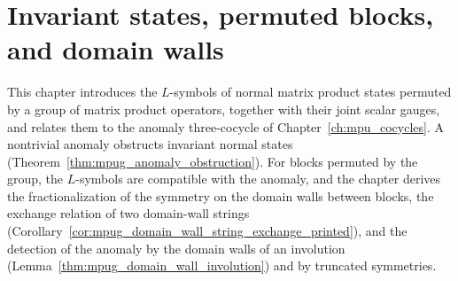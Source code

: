 \chapter{Invariant states, permuted blocks, and domain walls}
\label{ch:mpu_cocycles_permuted_blocks}

This chapter introduces the $L$-symbols of normal matrix product states
permuted by a group of matrix product operators, together with their joint
scalar gauges, and relates them to the anomaly three-cocycle of
Chapter~\ref{ch:mpu_cocycles}. A nontrivial anomaly obstructs invariant normal
states (Theorem~\ref{thm:mpug_anomaly_obstruction}). For blocks permuted by the
group, the $L$-symbols are compatible with the anomaly, and the chapter derives
the fractionalization of the symmetry on the domain walls between blocks, the
exchange relation of two domain-wall strings
(Corollary~\ref{cor:mpug_domain_wall_string_exchange_printed}), and the
detection of the anomaly by the domain walls of an involution
(Lemma~\ref{thm:mpug_domain_wall_involution}) and by truncated symmetries.


